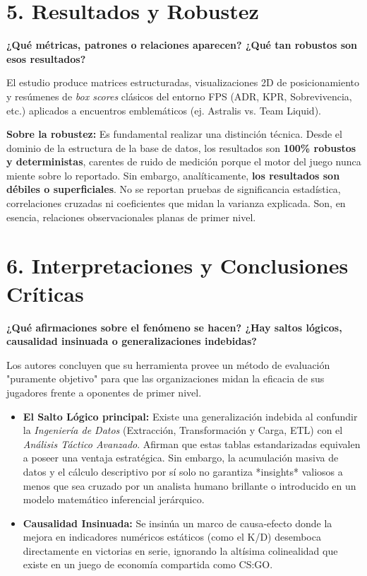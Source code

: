 \documentclass[12pt,a4paper]{article}
\begin{document}
\section*{5. Resultados y Robustez}
\textbf{¿Qué métricas, patrones o relaciones aparecen? ¿Qué tan robustos son esos resultados?}

El estudio produce matrices estructuradas, visualizaciones 2D de posicionamiento y resúmenes de \textit{box scores} clásicos del entorno FPS (ADR, KPR, Sobrevivencia, etc.) aplicados a encuentros emblemáticos (ej. Astralis vs. Team Liquid).

\textbf{Sobre la robustez:} Es fundamental realizar una distinción técnica. Desde el dominio de la estructura de la base de datos, los resultados son \textbf{100\% robustos y deterministas}, carentes de ruido de medición porque el motor del juego nunca miente sobre lo reportado. Sin embargo, analíticamente, \textbf{los resultados son débiles o superficiales}. No se reportan pruebas de significancia estadística, correlaciones cruzadas ni coeficientes que midan la varianza explicada. Son, en esencia, relaciones observacionales planas de primer nivel.

\section*{6. Interpretaciones y Conclusiones Críticas}
\textbf{¿Qué afirmaciones sobre el fenómeno se hacen? ¿Hay saltos lógicos, causalidad insinuada o generalizaciones indebidas?}

Los autores concluyen que su herramienta provee un método de evaluación "puramente objetivo" para que las organizaciones midan la eficacia de sus jugadores frente a oponentes de primer nivel. 
\begin{itemize}
    \item \textbf{El Salto Lógico principal:} Existe una generalización indebida al confundir la \textit{Ingeniería de Datos} (Extracción, Transformación y Carga, ETL) con el \textit{Análisis Táctico Avanzado}. Afirman que estas tablas estandarizadas equivalen a poseer una ventaja estratégica. Sin embargo, la acumulación masiva de datos y el cálculo descriptivo por sí solo no garantiza *insights* valiosos a menos que sea cruzado por un analista humano brillante o introducido en un modelo matemático inferencial jerárquico.
    \item \textbf{Causalidad Insinuada:} Se insinúa un marco de causa-efecto donde la mejora en indicadores numéricos estáticos (como el K/D) desemboca directamente en victorias en serie, ignorando la altísima colinealidad que existe en un juego de economía compartida como CS:GO.
\end{itemize}
\end{document}

